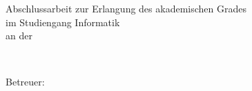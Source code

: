 \begin{titlepage}
	
	
	\vspace{2em}
	\begin{center}
	\ifdefined\graduation%
	\if\graduation\empty%
	\else%
	\textsf{Abschlussarbeit zur Erlangung des akademischen Grades}\\[0.5cm]
	\textsf{\graduation} \textsf{im Studiengang Informatik}\\[0.5cm]
	\textsf{an der \institution}\\[0.5cm]
	\textsf{\subinstitution}
	\fi
	\end{center}
	
	\vspace*{\fill}

 	\enlargethispage{1\baselineskip}
	\hrulefill\\
	\begin{center}
		\textsf{Betreuer: \\  \supervisor}
	\end{center}
	
	\vspace*{\fill}
	
	
	\enlargethispage{4\baselineskip}
	\begin{minipage}[b]{0mm}
	\end{minipage}
	
	
\end{titlepage}

